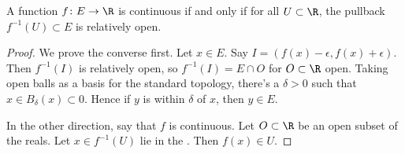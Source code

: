 \begin{defn}
    \label{defn:relatively_open}
    \TODO
\end{defn}

\begin{thm}
    \label{thm:continuity_by_pull_backs}
    A function $f \colon E \to \R$ is continuous if and only if for all $U \subset \R$, the pullback $f^{-1}(U) \subset E$ is relatively open.
\end{thm}

\begin{proof}
    We prove the converse first. Let $x \in E$. Say $I = (f(x) - \epsilon, f(x) + \epsilon)$. Then $f^{-1}(I)$ is relatively open, so $f^{-1}(I) = E \cap O$ for $O \subset \R$ open. Taking open balls as a basis for the standard topology, there's a $\delta > 0$ such that $x \in B_\delta(x) \subset 0$. Hence if $y$ is within $\delta$ of $x$, then $y \in E$.

    In the other direction, say that $f$ is continuous. Let $O \subset \R$ be an open subset of the reals. Let $x \in f^{-1}(U)$ lie in the 
    . Then $f(x) \in U$.
\end{proof}
